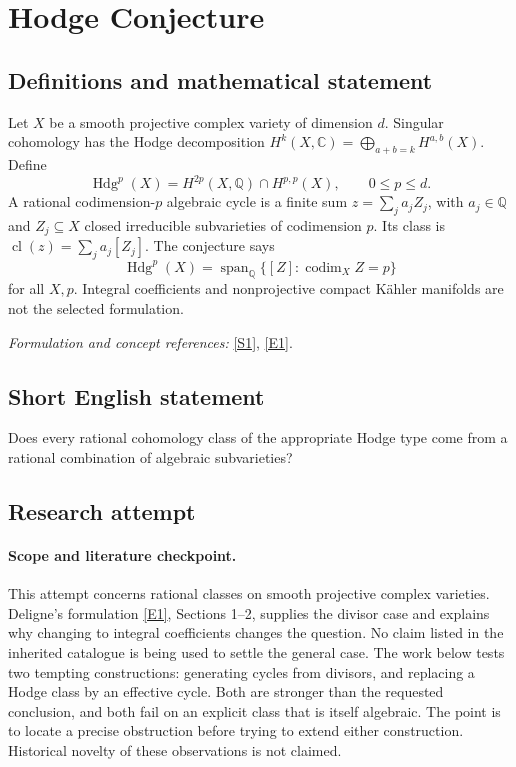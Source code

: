 \documentclass[11pt]{article}
\begin{document}
\section*{\texorpdfstring{Hodge Conjecture}{Hodge Conjecture}}\label{6}
\subsection{Definitions and mathematical statement}
Let $X$ be a smooth projective complex variety of dimension $d$. Singular cohomology has the Hodge decomposition $H^k(X,{\mathbb{C}})=\bigoplus_{a+b=k}H^{a,b}(X)$. Define
\[
 \operatorname{Hdg}^{p}(X)=H^{2p}(X,{\mathbb{Q}})\cap H^{p,p}(X),\qquad 0\le p\le d.
\]
A rational codimension-$p$ algebraic cycle is a finite sum $z=\sum_j a_j Z_j$, with $a_j\in{\mathbb{Q}}$ and $Z_j\subseteq X$ closed irreducible subvarieties of codimension $p$. Its class is $\operatorname{cl}(z)=\sum_j a_j[Z_j]$. The conjecture says
\[
 \operatorname{Hdg}^{p}(X)=\operatorname{span}_{{\mathbb{Q}}}\{[Z]:\operatorname{codim}_X Z=p\}
\]
for all $X,p$. Integral coefficients and nonprojective compact Kähler manifolds are not the selected formulation.
\par\smallskip\textit{Formulation and concept references:} \href{https://www.claymath.org/library/monographs/MPPc.pdf}{[S1]}, \href{https://www.claymath.org/wp-content/uploads/2022/06/hodge.pdf}{[E1]}.

\subsection{Short English statement}
Does every rational cohomology class of the appropriate Hodge type come from a rational combination of algebraic subvarieties?
\subsection{Research attempt}

\paragraph{Scope and literature checkpoint.}
This attempt concerns rational classes on smooth projective complex varieties.
Deligne's formulation \href{https://www.claymath.org/wp-content/uploads/2022/06/hodge.pdf}{[E1]}, Sections 1--2, supplies the divisor case and
explains why changing to integral coefficients changes the question. No claim
listed in the inherited catalogue is being used to settle the general case.
The work below tests two tempting constructions: generating cycles from
divisors, and replacing a Hodge class by an effective cycle. Both are stronger
than the requested conclusion, and both fail on an explicit class that is
itself algebraic. The point is to locate a precise obstruction before trying
to extend either construction. Historical novelty of these observations is
not claimed.
\end{document}
